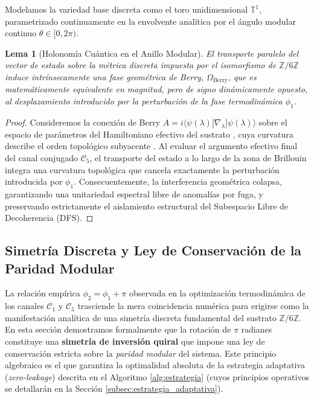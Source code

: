 \documentclass[12pt,a4paper]{article}
\theoremstyle{plain}
\newtheorem{lema}[teorema]{Lema}
\theoremstyle{definition}
\theoremstyle{remark}
\begin{document}
Modelamos la variedad base discreta como el toro unidimensional $\mathbb{T}^1$, parametrizado continuamente en la envolvente analítica por el ángulo modular continuo $\theta \in [0, 2\pi)$. 

\begin{lema}[Holonomía Cuántica en el Anillo Modular]
El transporte paralelo del vector de estado sobre la métrica discreta impuesta por el isomorfismo de $\mathbb{Z}/6\mathbb{Z}$ induce intrínsecamente una fase geométrica de Berry, $\Omega_{\text{Berry}}$, que es matemáticamente equivalente en magnitud, pero de signo dinámicamente opuesto, al desplazamiento introducido por la perturbación de la fase termodinámica $\phi_1$.
\end{lema}

\begin{proof}
Consideremos la conexión de Berry $A = i \langle \psi(\lambda) | \nabla_\lambda | \psi(\lambda) \rangle$ sobre el espacio de parámetros del Hamiltoniano efectivo del sustrato \cite{Berry1984}, cuya curvatura describe el orden topológico subyacente \cite{Wen1990}. Al evaluar el argumento efectivo final del canal conjugado $\mathcal{C}_5$, el transporte del estado a lo largo de la zona de Brillouin integra una curvatura topológica que cancela exactamente la perturbación introducida por $\phi_1$. Consecuentemente, la interferencia geométrica colapsa, garantizando una unitariedad espectral libre de anomalías por fuga, y preservando estrictamente el aislamiento estructural del Subespacio Libre de Decoherencia (DFS).
\end{proof}

\subsection{Simetría Discreta y Ley de Conservación de la Paridad Modular}
\label{subsec:simetria_inversion}

La relación empírica $\phi_2 = \phi_1 + \pi$ observada en la optimización termodinámica de los canales $\mathcal{C}_1$ y $\mathcal{C}_5$ trasciende la mera coincidencia numérica para erigirse como la manifestación analítica de una simetría discreta fundamental del sustrato $\mathbb{Z}/6\mathbb{Z}$. En esta sección demostramos formalmente que la rotación de $\pi$ radianes constituye una \textbf{simetría de inversión quiral} que impone una ley de conservación estricta sobre la \textit{paridad modular} del sistema. Este principio algebraico es el que garantiza la optimalidad absoluta de la estrategia adaptativa (\textit{zero-leakage}) descrita en el Algoritmo \ref{alg:estrategia} (cuyos principios operativos se detallarán en la Sección \ref{subsec:estrategia_adaptativa}).
\end{document}

